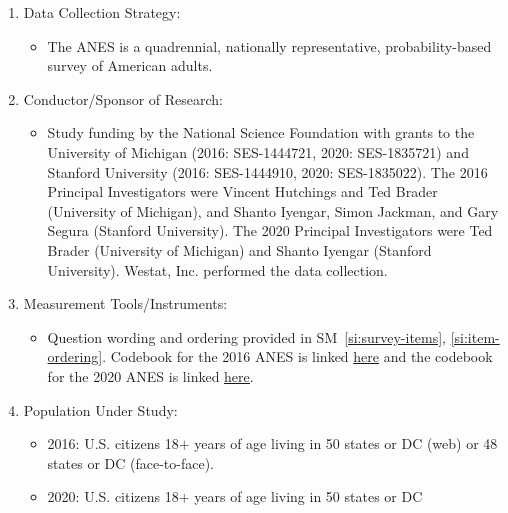 \documentclass[12pt]{article}
\begin{document}
\begin{appendices}
\begin{refsection}
\begin{enumerate}
	\item Data Collection Strategy:
	\begin{itemize}
		\item The ANES is a quadrennial, nationally representative, probability-based survey of American adults.
	\end{itemize}
	
	\item Conductor/Sponsor of Research: 
	\begin{itemize}
		\item Study funding by the National Science Foundation with grants to the University of Michigan (2016: SES-1444721, 2020: SES-1835721) and Stanford University (2016: SES-1444910, 2020: SES-1835022). The 2016 Principal Investigators were Vincent Hutchings and Ted Brader (University of Michigan), and Shanto Iyengar, Simon Jackman, and Gary Segura (Stanford University). The 2020 Principal Investigators were Ted Brader (University of Michigan) and Shanto Iyengar (Stanford University). Westat, Inc. performed the data collection. 
	\end{itemize}
	
	\item Measurement Tools/Instruments:
	\begin{itemize}
		\item Question wording and ordering provided in SM~\ref{si:survey-items}, \ref{si:item-ordering}. Codebook for the 2016 ANES is linked \href{https://electionstudies.org/wp-content/uploads/2018/12/anes_timeseries_2016_userguidecodebook.pdf}{\underline{here}} and the codebook for the 2020 ANES is linked \href{https://electionstudies.org/wp-content/uploads/2022/02/anes_timeseries_2020_userguidecodebook_20220210.pdf}{\underline{here}}. 
	\end{itemize}
	
	\item Population Under Study:
	\begin{itemize}
		\item 2016: U.S. citizens 18$+$ years of age living in 50 states or DC (web) or 48 states or DC (face-to-face). 
		\item 2020: U.S. citizens 18$+$ years of age living in 50 states or DC
	\end{itemize}
	

\end{enumerate}
\end{refsection}
\end{appendices}
\end{document}
